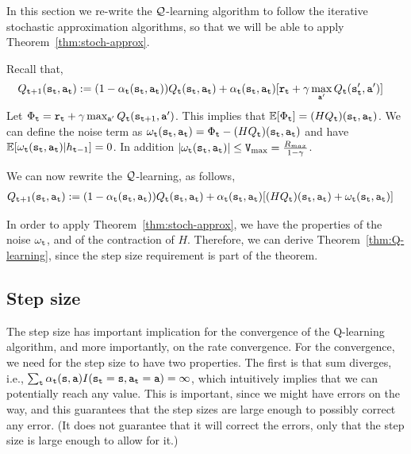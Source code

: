 In this section we re-write the $\mathcal{Q}$-learning algorithm to follow the
iterative stochastic approximation algorithms, so that we will be
able to apply Theorem~\ref{thm:stoch-approx}.

Recall that,
\begin{align*}
 Q_{{\tt t}+1}({\tt s}_{\tt t},{\tt a}_{\tt t}) & :=   (1-\alpha_{\tt t}({\tt s}_{\tt t},{\tt a}_{\tt t}) ) Q_{\tt t} ({\tt s}_{\tt t},{\tt a}_{\tt t}) + \alpha_{\tt t}({\tt s}_{\tt t},{\tt a}_{\tt t})  [{\tt r}_{\tt t} +
\gamma \max_{{\tt a}'} Q_{\tt t} ({\tt s}_{{\tt t}}',
{\tt a}')]
\end{align*}
Let $\Phi_{\tt t}={\tt r}_{\tt t} + \gamma \max_{{\tt a}'} Q_{\tt t}
({\tt s}_{{\tt t}+1}, {\tt a}')$. This implies that $\mathbb{E}[\Phi_{\tt t}]=
(HQ_{\tt t})({\tt s}_{\tt t},{\tt a}_{\tt t})$. We can define the noise
term as
$\omega_{\tt t}({\tt s}_{\tt t},{\tt a}_{\tt t})=\Phi_{\tt t}-(HQ_{\tt t})({\tt s}_{\tt t},{\tt a}_{\tt t})$
and have $\mathbb{E}[\omega_{\tt t}({\tt s}_{\tt t},{\tt a}_{\tt t})|h_{{\tt t}-1}]=0$. In
addition $|\omega_{\tt t}({\tt s}_{\tt t},{\tt a}_{\tt t})|\leq {\tt V}_{\max }=
\frac{R_{max}}{1-\gamma}$.

We can now rewrite the $\mathcal{Q}$-learning, as follows,
\begin{align*}
 Q_{{\tt t}+1}({\tt s}_{\tt t},{\tt a}_{\tt t}) & :=   (1-\alpha_{\tt t}({\tt s}_{\tt t},{\tt a}_{\tt t}) ) Q_{\tt t} ({\tt s}_{\tt t},{\tt a}_{\tt t}) + \alpha_{\tt t}({\tt s}_{\tt t},{\tt a}_{\tt t})
 [(HQ_{\tt t})({\tt s}_{\tt t},{\tt a}_{\tt t})+\omega_{\tt t}({\tt s}_{\tt t},{\tt a}_{\tt t})]
\end{align*}

In order to apply Theorem~\ref{thm:stoch-approx}, we have the
properties of the noise $\omega_{\tt t}$, and of the contraction of
$H$. Therefore, we can derive Theorem~\ref{thm:Q-learning}, since
the step size requirement is part of the theorem.

\subsection{Step size}

The step size has important implication for the convergence of the
Q-learning algorithm, and more importantly, on the rate convergence.
For the convergence, we need for the step size to have two
properties. The first is that sum diverges, i.e., $\sum_{\tt t}
\alpha_{\tt t}({\tt s},{\tt a})
I({\tt s}_{\tt t}={\tt s},{\tt a}_{\tt t}={\tt a})=\infty $, which
intuitively implies that we can potentially reach any value. This is
important, since we might have errors on the way, and this
guarantees that the step sizes are large enough to possibly
correct any error. (It does not guarantee that it will correct the
errors, only that the step size is large enough to allow for it.)

